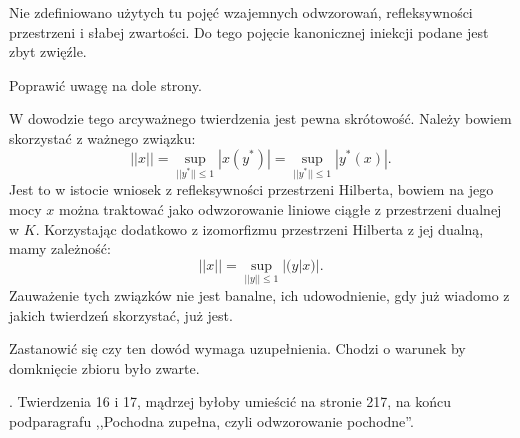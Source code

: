 \documentclass[a4paper,11pt]{article}
\begin{document}
\vspace{\spaceFour}


\start {} Nie zdefiniowano użytych tu pojęć wzajemnych
odwzorowań, refleksywności przestrzeni i słabej zwartości. Do tego
pojęcie kanonicznej iniekcji podane jest zbyt zwięźle.

\vspace{\spaceFour}


\start {} Poprawić uwagę na dole strony.

\vspace{\spaceFour}


\start {} W dowodzie tego arcyważnego twierdzenia jest pewna
skrótowość. Należy bowiem skorzystać z ważnego związku:
\begin{equation*}
  || x || = \sup_{ || y^{ * } || \leq 1 } | x( y^{ * } ) | 
  = \sup_{ || y^{ * } || \leq1 } | y^{ * }( x ) | \textrm{.}  
\end{equation*}
Jest to w istocie wniosek z refleksywności przestrzeni Hilberta,
bowiem na jego mocy $x$ można traktować jako odwzorowanie liniowe
ciągłe z przestrzeni dualnej w $K$. Korzystając dodatkowo z
izomorfizmu przestrzeni Hilberta z jej dualną, mamy \linebreak
zależność:
\begin{equation*}
  || x || = \sup_{ || y || \leq 1 } | ( y | x ) | \textrm{.}  
\end{equation*}
Zauważenie tych związków nie jest banalne, ich udowodnienie, gdy już
wiadomo z jakich twierdzeń skorzystać, już jest.

\vspace{\spaceFour}


\start {} Zastanowić się czy ten dowód wymaga uzupełnienia.
Chodzi o warunek by domknięcie zbioru było zwarte.

\vspace{\spaceFour}


\start {}. Twierdzenia 16 i 17, mądrzej byłoby umieścić na
stronie 217, na końcu podparagrafu ,,Pochodna zupełna, czyli
odwzorowanie pochodne''.

\vspace{\spaceFour}
\end{document}
